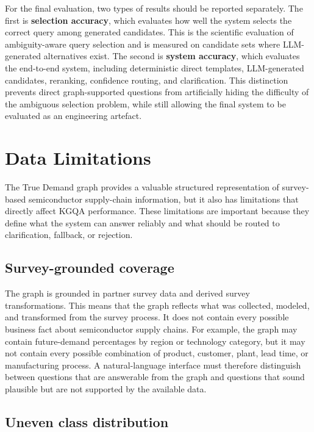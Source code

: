 For the final evaluation, two types of results should be reported separately. The first is \textbf{selection accuracy}, which evaluates how well the system selects the correct query among generated candidates. This is the scientific evaluation of ambiguity-aware query selection and is measured on candidate sets where LLM-generated alternatives exist. The second is \textbf{system accuracy}, which evaluates the end-to-end system, including deterministic direct templates, LLM-generated candidates, reranking, confidence routing, and clarification. This distinction prevents direct graph-supported questions from artificially hiding the difficulty of the ambiguous selection problem, while still allowing the final system to be evaluated as an engineering artefact.

\section{Data Limitations}
\label{sec:data-limitations}

The True Demand graph provides a valuable structured representation of survey-based semiconductor supply-chain information, but it also has limitations that directly affect KGQA performance. These limitations are important because they define what the system can answer reliably and what should be routed to clarification, fallback, or rejection.

\subsection{Survey-grounded coverage}

The graph is grounded in partner survey data and derived survey transformations. This means that the graph reflects what was collected, modeled, and transformed from the survey process. It does not contain every possible business fact about semiconductor supply chains. For example, the graph may contain future-demand percentages by region or technology category, but it may not contain every possible combination of product, customer, plant, lead time, or manufacturing process. A natural-language interface must therefore distinguish between questions that are answerable from the graph and questions that sound plausible but are not supported by the available data.

\subsection{Uneven class distribution}

